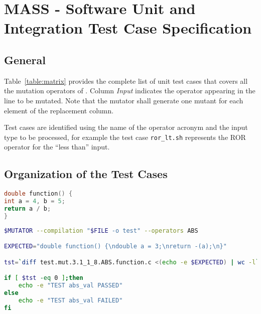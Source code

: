 
\chapter{MASS - Software Unit and Integration Test Case Specification}
\label{chap:spec}

\section{General}




Table~\ref{table:matrix} provides the complete list of unit test cases that covers all the mutation operators of \FAQAS. 
Column \emph{Input} indicates the operator appearing in the line to be mutated.
Note that the mutator shall generate one mutant for each element of the replacement column.

Test cases are identified using the name of the operator acronym and the input type to be processed, for example the test case \texttt{ror\_lt.sh} represents the ROR operator for the ``less than'' input.








\section{Organization of the Test Cases}

\begin{lstlisting}[language=C, label=test_source, caption=C function example.]
double function() {
int a = 4, b = 5;
return a / b;
}
\end{lstlisting}

\begin{lstlisting}[language=bash, label=test_example, caption=ABS test case example.]
$MUTATOR --compilation "$FILE -o test" --operators ABS

EXPECTED="double function() {\ndouble a = 3;\nreturn -(a);\n}"

tst=`diff test.mut.3.1_1_8.ABS.function.c <(echo -e $EXPECTED) | wc -l`

if [ $tst -eq 0 ];then
    echo -e "TEST abs_val PASSED"
else
    echo -e "TEST abs_val FAILED"
fi
\end{lstlisting}


